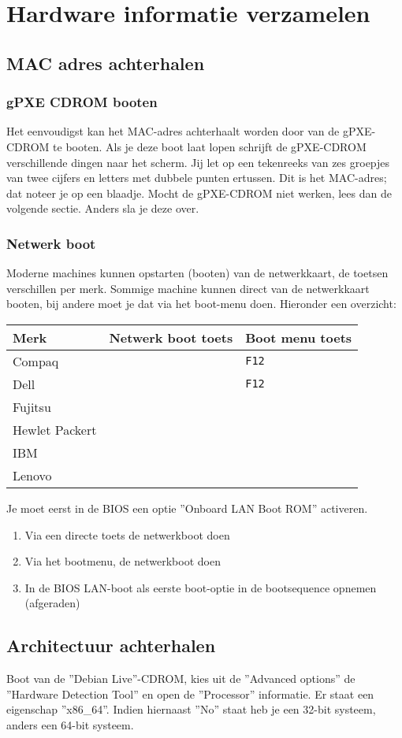\section{Hardware informatie verzamelen}
\subsection{MAC adres achterhalen}
\subsubsection{gPXE CDROM booten}
Het eenvoudigst kan het MAC-adres achterhaalt worden door van de gPXE-CDROM te booten. Als je deze boot laat lopen schrijft de gPXE-CDROM verschillende dingen naar het scherm. Jij let op een tekenreeks van zes groepjes van twee cijfers en letters met dubbele punten ertussen. Dit is het MAC-adres; dat noteer je op een blaadje. Mocht de gPXE-CDROM niet werken, lees dan de volgende sectie. Anders sla je deze over.
\subsubsection{Netwerk boot}
Moderne machines kunnen opstarten (booten) van de netwerkkaart, de toetsen verschillen per merk. Sommige machine kunnen direct van de netwerkkaart booten, bij andere moet je dat via het boot-menu doen. Hieronder een overzicht:
\begin{table}[H]
	\begin{tabular}{| l | l |  l |}
	\hline 
	\textbf{Merk} & \textbf{Netwerk boot toets} & \textbf{Boot menu toets}\\
	\hline
	Compaq &  & \texttt{F12}\\
	\hline
	Dell &  & \texttt{F12} \\
	\hline
	Fujitsu &  & \\
	\hline
	Hewlet Packert &   & \\
	\hline
	IBM &   & \\
	\hline
	Lenovo &  &  \\
	\hline
\end{tabular}
\end{table}
Je moet eerst in de BIOS een optie ''Onboard LAN Boot ROM'' activeren.
\begin{enumerate}
	\item{Via een directe toets de netwerkboot doen}
	\item{Via het bootmenu, de netwerkboot doen}
	\item{In de BIOS LAN-boot als eerste boot-optie in de bootsequence opnemen (afgeraden)}
\end{enumerate}
\subsection{Architectuur achterhalen}
Boot van de ''Debian Live''-CDROM, kies uit de ''Advanced options'' de ''Hardware Detection Tool'' en open de ''Processor'' informatie.
Er staat een eigenschap ''x86\_64''. Indien hiernaast ''No'' staat heb je een 32-bit systeem, anders een 64-bit systeem.
